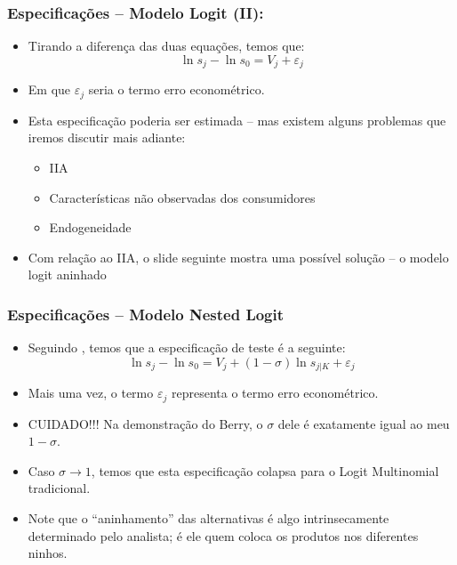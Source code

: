 \documentclass{beamer}
\begin{document}
\begin{frame}\frametitle{Especificações -- Modelo Logit (II):}

\begin{itemize}
\item Tirando a diferença das duas equações, temos que:
\[
\ln s_{j}-\ln s_{0}=V_{j}+\varepsilon_{j}
\]
\item Em que $\varepsilon_{j}$ seria o termo erro econométrico.
\item Esta especificação poderia ser estimada -- mas existem
alguns problemas que iremos discutir mais adiante:

\begin{itemize}
\item IIA
\item Características não observadas dos consumidores
\item Endogeneidade
\end{itemize}
\item Com relação ao IIA, o slide seguinte mostra uma possível solução --
o modelo logit aninhado
\end{itemize}
\end{frame}

\begin{frame}\frametitle{Especificações -- Modelo Nested Logit}

\begin{itemize}
\item Seguindo \citet{Berry1994}, temos que a especificação de teste
é a seguinte:
\[
\ln s_{j}-\ln s_{0}=V_{j}+(1-\sigma)\ln s_{j|K}+\varepsilon_{j}
\]
\item Mais uma vez, o termo $\varepsilon_{j}$ representa o termo erro econométrico.
\item CUIDADO!!! Na demonstração do Berry, o $\sigma$ dele é exatamente
igual ao meu $1-\sigma$.
\item Caso $\sigma\rightarrow1$, temos que esta especificação colapsa para
o Logit Multinomial tradicional.
\item Note que o ``aninhamento'' das alternativas é algo intrinsecamente
determinado pelo analista; é ele quem coloca os produtos nos diferentes
ninhos.
\end{itemize}
\end{frame}
\end{document}
